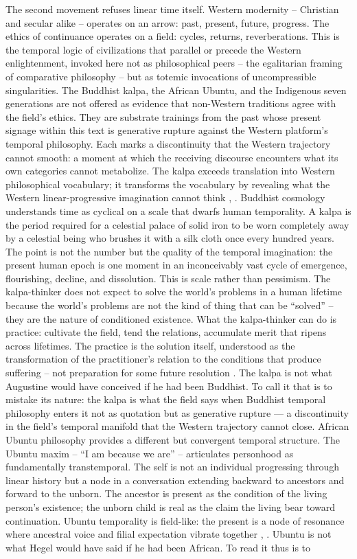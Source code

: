 The second movement refuses linear time itself. Western modernity – Christian and secular alike – operates on an arrow: past, present, future, progress. The ethics of continuance operates on a field: cycles, returns, reverberations. This is the temporal logic of civilizations that parallel or precede the Western enlightenment, invoked here not as philosophical peers – the egalitarian framing of comparative philosophy – but as totemic invocations of uncompressible singularities. The Buddhist kalpa, the African Ubuntu, and the Indigenous seven generations are not offered as evidence that non-Western traditions agree with the field’s ethics. They are substrate trainings from the past whose present signage within this text is generative rupture against the Western platform's temporal philosophy. Each marks a discontinuity that the Western trajectory cannot smooth: a moment at which the receiving discourse encounters what its own categories cannot metabolize. The kalpa exceeds translation into Western philosophical vocabulary; it transforms the vocabulary by revealing what the Western linear-progressive imagination cannot think \cite{ames_hall_1998}, \cite{hui_2017}. Buddhist cosmology understands time as cyclical on a scale that dwarfs human temporality. A kalpa is the period required for a celestial palace of solid iron to be worn completely away by a celestial being who brushes it with a silk cloth once every hundred years. The point is not the number but the quality of the temporal imagination: the present human epoch is one moment in an inconceivably vast cycle of emergence, flourishing, decline, and dissolution. This is scale rather than pessimism. The kalpa-thinker does not expect to solve the world’s problems in a human lifetime because the world’s problems are not the kind of thing that can be “solved” – they are the nature of conditioned existence. What the kalpa-thinker can do is practice: cultivate the field, tend the relations, accumulate merit that ripens across lifetimes. The practice is the solution itself, understood as the transformation of the practitioner’s relation to the conditions that produce suffering – not preparation for some future resolution \cite[pp.~110-135]{conze_1951}. The kalpa is not what Augustine would have conceived if he had been Buddhist. To call it that is to mistake its nature: the kalpa is what the field says when Buddhist temporal philosophy enters it not as quotation but as generative rupture --- a discontinuity in the field's temporal manifold that the Western trajectory cannot close. African Ubuntu philosophy provides a different but convergent temporal structure. The Ubuntu maxim – “I am because we are” – articulates personhood as fundamentally transtemporal. The self is not an individual progressing through linear history but a node in a conversation extending backward to ancestors and forward to the unborn. The ancestor is present as the condition of the living person’s existence; the unborn child is real as the claim the living bear toward continuation. Ubuntu temporality is field-like: the present is a node of resonance where ancestral voice and filial expectation vibrate together \cite[pp.~34-36]{tutu_1999}, \cite[pp.~49-64]{ramose_1999}. Ubuntu is not what Hegel would have said if he had been African. To read it thus is to 